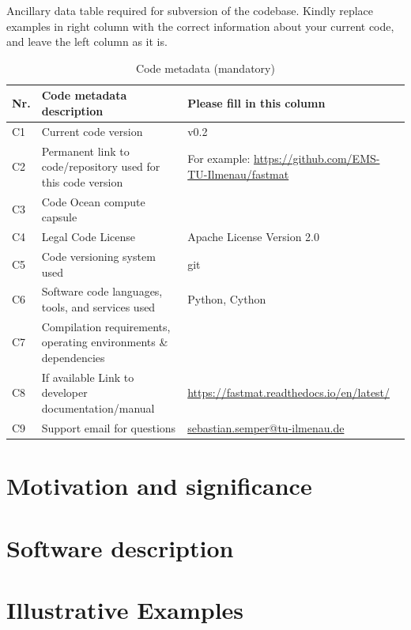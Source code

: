 \documentclass[preprint, review, 12pt, a4paper]{elsarticle}
\begin{document}
Ancillary data table required for subversion of the codebase. Kindly replace examples in right column with the correct information about your current code, and leave the left column as it is.

\begin{table}[H]
\begin{tabular}{|l|p{6.5cm}|p{6.5cm}|}
\hline
\textbf{Nr.} & \textbf{Code metadata description} & \textbf{Please fill in this column} \\
\hline
C1 & Current code version & v0.2 \\
\hline
C2 & Permanent link to code/repository used for this code version & For example: \url{https://github.com/EMS-TU-Ilmenau/fastmat} \\
\hline
C3 & Code Ocean compute capsule & \\
\hline
C4 & Legal Code License   & Apache License Version 2.0 \\
\hline
C5 & Code versioning system used & git \\
\hline
C6 & Software code languages, tools, and services used & Python, Cython \\
\hline
C7 & Compilation requirements, operating environments \& dependencies & \\
\hline
C8 & If available Link to developer documentation/manual & \url{https://fastmat.readthedocs.io/en/latest/} \\
\hline
C9 & Support email for questions & \url{sebastian.semper@tu-ilmenau.de}\\
\hline
\end{tabular}
\caption{Code metadata (mandatory)}
\label{mand_metadata}
\end{table}


\linenumbers


\section{Motivation and significance}\label{motivation}




\section{Software description}\label{description}



\section{Illustrative Examples}\label{examples}

\end{document}

